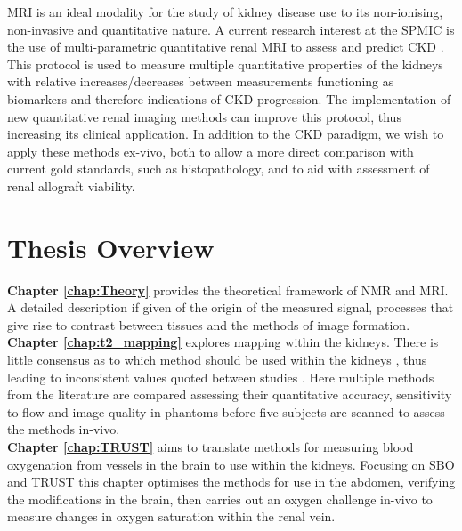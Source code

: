 \ac{MRI} is an ideal modality for the study of kidney disease use to its non-ionising, non-invasive and quantitative nature. A current research interest at the \ac{SPMIC} is the use of multi-parametric quantitative renal \ac{MRI} to assess and predict \ac{CKD} \cite{cox_multiparametric_2017, buchanan_quantitative_2019}. This protocol is used to measure multiple quantitative properties of the kidneys with relative increases/decreases between measurements functioning as biomarkers and therefore indications of \ac{CKD} progression. The implementation of new quantitative renal imaging methods can improve this protocol, thus increasing its clinical application. In addition to the \ac{CKD} paradigm, we wish to apply these methods ex-vivo, both to allow a more direct comparison with current gold standards, such as histopathology, and to aid with assessment of renal allograft viability.

\section{Thesis Overview}
\label{sec:intro_overview}

\textbf{Chapter \ref{chap:Theory}} provides the theoretical framework of \ac{NMR} and \ac{MRI}. A detailed description if given of the origin of the measured signal, processes that give rise to contrast between tissues and the methods of image formation. \\

\textbf{Chapter \ref{chap:t2_mapping}} explores \ttwo mapping within the kidneys. There is little consensus as to which method should be used within the kidneys \cite{dekkers_consensus-based_2019}, thus leading to inconsistent values quoted between studies \cite{wolf_magnetic_2018}. Here multiple methods from the literature are compared assessing their quantitative accuracy, sensitivity to flow and image quality in phantoms before five subjects are scanned to assess the methods in-vivo.\\

\textbf{Chapter \ref{chap:TRUST}} aims to translate methods for measuring blood oxygenation from vessels in the brain to use within the kidneys. Focusing on \ac{SBO} \cite{jain_mri_2010} and \ac{TRUST} \cite{lu_quantitative_2008} this chapter optimises the methods for use in the abdomen, verifying the modifications in the brain, then carries out an oxygen challenge in-vivo to measure changes in oxygen saturation within the renal vein.\\

